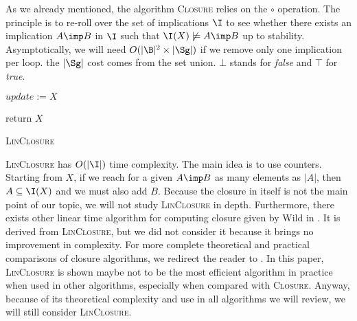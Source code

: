 As we already mentioned, the algorithm \textsc{Closure} relies on the $\circ$ 
operation. The principle is to re-roll over the set of implications $\I$ to see 
whether there exists an implication $A \imp B$ in $\I$ such that $\I(X) 
\not\models A \imp B$ up to stability. Asymptotically, we will need $O(|\B|^2 
\times |\Sg|)$ if we remove only one implication per loop. the $|\Sg|$ cost
comes from the set union. $\bot$ stands for \textit{false} and $\top$ for \textit{true}.

\vspace{1.2em}

\begin{algorithm}

\BlankLine
\BlankLine


\BlankLine

$update := X$ \;

\BlankLine


return $X$ \;

\caption{\textsc{LinClosure}}
\label{alg:linclosure}
\end{algorithm}

\textsc{LinClosure} has $O(|\I|)$ time complexity. The main idea is to use
counters. Starting from $X$, if we reach for a given $A \imp B$ as many elements
as $|A|$, then $A \subseteq \I(X)$ and we must also add $B$. Because the closure
in itself is not the main point of our topic, we will not study 
\textsc{LinClosure} in depth. Furthermore, there exists other linear time 
algorithm for computing closure given by Wild in \cite{wild_computations_1995}. It is derived from \textsc{LinClosure}, but we did not consider it because it brings no improvement in complexity. For more complete theoretical and practical comparisons of closure algorithms, we redirect the reader to 
\cite{bazhanov_optimizations_2014}. In this paper, \textsc{LinClosure} is 
shown maybe not to be the most efficient algorithm in practice when used in 
other algorithms, especially when compared with \textsc{Closure}. Anyway, 
because of its theoretical complexity and use in all algorithms we will review, 
we will still consider \textsc{LinClosure}.

